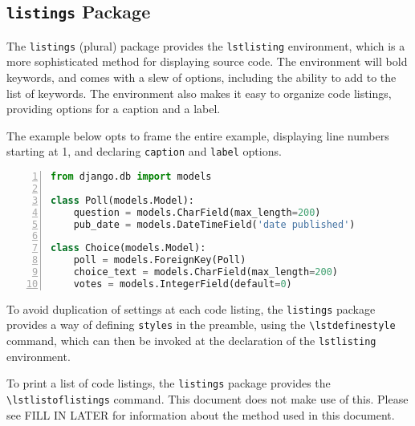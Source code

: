 
\subsection{\texttt{listings} Package}

The \verb|listings| (plural) package provides the \verb|lstlisting| environment, which is a more sophisticated method for displaying source code. The environment will bold keywords, and comes with a slew of options, including the ability to add to the list of keywords. The environment also makes it easy to organize code listings, providing options for a caption and a label.

The example below opts to frame the entire example, displaying line numbers starting at 1, and declaring \verb|caption| and \verb|label| options.

\begin{lstlisting}[aboveskip=\baselineskip,%
                   basicstyle=\ttfamily,%
                   belowskip=\baselineskip,%
                   caption={[Listings Example]
                            \lstinline{models.py} from Django Tutorial using Listings},%
                   columns=fixed,%
                   firstnumber=1,%
                   frame=single,%
                   label=code:django:models_basic_listing,%
                   language=Python,%
                   numbers=left,%
                   showstringspaces=false,%
                   showspaces=false]
from django.db import models

class Poll(models.Model):
    question = models.CharField(max_length=200)
    pub_date = models.DateTimeField('date published')

class Choice(models.Model):
    poll = models.ForeignKey(Poll)
    choice_text = models.CharField(max_length=200)
    votes = models.IntegerField(default=0)
\end{lstlisting}

To avoid duplication of settings at each code listing, the \verb|listings| package provides a way of defining \verb|styles| in the preamble, using the \verb|\lstdefinestyle| command, which can then be invoked at the declaration of the \verb|lstlisting| environment.

To print a list of code listings, the \verb|listings| package provides the \verb|\lstlistoflistings| command. This document does not make use of this. Please see FILL IN LATER for information about the method used in this document.

